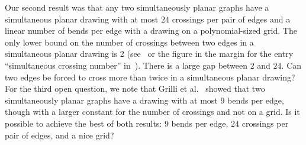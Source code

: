 \documentclass{llncs}
\begin{document}
Our second result was that any two simultaneously planar graphs have a simultaneous planar drawing with at most $24$ crossings per pair of edges and a linear number of bends per edge with a drawing on a polynomial-sized grid.  The only lower bound on the number of crossings between two edges in a simultaneous planar drawing is 2 (see~\cite{CJS08} or the figure in the margin for the entry ``simultaneous crossing number'' in~\cite{S13b}).  There is a large gap between $2$ and $24$.  Can two edges be forced to cross more than twice in a simultaneous planar drawing?
For the third open question, we note that
Grilli et al.~\cite{Grilli2014} showed that two simultaneously planar graphs have a drawing with at most $9$ bends per edge, though with a larger constant for the number of crossings and not on a grid.  Is it possible to achieve the best of both results:  $9$ bends per edge, $24$ crossings per pair of edges, and a nice grid?





\end{document}

